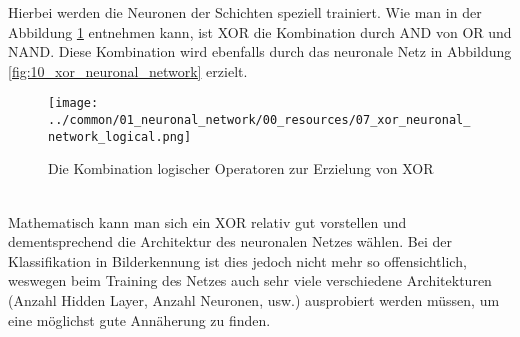 Hierbei werden die Neuronen der Schichten speziell trainiert. Wie man in der Abbildung \ref{fig:11_xor_neuronal_network_operator}
entnehmen kann, ist \glqq XOR\grqq{} die Kombination durch \glqq AND\grqq{} von \glqq OR\grqq{} und \glqq NAND\grqq{}.
Diese Kombination wird ebenfalls durch das neuronale Netz in Abbildung \ref{fig:10_xor_neuronal_network} erzielt.
\begin{figure}[h!]
    \begin{center}
        \texttt{[image: ../common/01\_neuronal\_network/00\_resources/07\_xor\_neuronal\_network\_logical.png]}
    \end{center}
    \caption{Die Kombination logischer Operatoren zur Erzielung von XOR}
    \label{fig:11_xor_neuronal_network_operator}
\end{figure}
\\

Mathematisch kann man sich ein \glqq XOR\grqq{} relativ gut vorstellen und dementsprechend die Architektur des neuronalen
Netzes wählen. Bei der Klassifikation in Bilderkennung ist dies jedoch nicht mehr so offensichtlich, weswegen beim Training des
Netzes auch sehr viele verschiedene Architekturen (Anzahl Hidden Layer, Anzahl Neuronen, usw.) ausprobiert werden müssen,
um eine möglichst gute Annäherung zu finden.